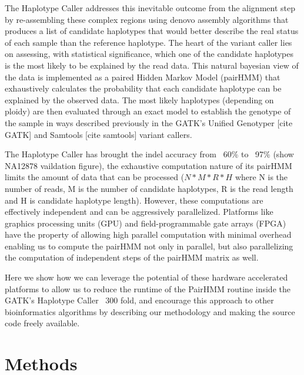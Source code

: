 \documentclass[11pt, oneside]{article}
\begin{document}
    The Haplotype Caller addresses this inevitable outcome from the alignment
    step by re-assembling these complex regions using denovo assembly algorithms
    that produces a list of candidate haplotypes that would better describe the
    real status of each sample than the reference haplotype. The heart of the
    variant caller lies on assessing, with statistical significance, which one
    of the candidate haplotypes is the most likely to be explained by the read
    data. This natural bayesian view of the data is implemented as a paired
    Hidden Markov Model (pairHMM) that exhaustively calculates the probability
    that each candidate haplotype can be explained by the observed data. The
    most likely haplotypes (depending on ploidy) are then evaluated through an
    exact model to establish the genotype of the sample in ways described
    previously in the GATK's Unified Genotyper [cite GATK] and Samtools [cite
    samtools] variant callers. 

    The Haplotype Caller has brought the indel accuracy from ~60\% to ~97\%
    (show NA12878 vaildation figure), the exhaustive computation nature of its
    pairHMM limits the amount of data that can be processed ($N*M*R*H$ where N
    is the number of reads, M is the number of candidate haplotypes, R is the
    read length and H is candidate haplotype length). However, these
    computations are effectively independent and can be aggressively
    parallelized. Platforms like graphics processing units (GPU) and
    field-programmable gate arrays (FPGA) have the property of allowing high
    parallel computation with minimal overhead enabling us to compute the
    pairHMM not only in parallel, but also parallelizing the computation of
    independent steps of the pairHMM matrix as well.

    Here we show how we can leverage the potential of these hardware accelerated
    platforms to allow us to reduce the runtime of the PairHMM routine inside
    the GATK's Haplotype Caller ~300 fold, and encourage this approach to other
    bioinformatics algorithms by describing our methodology and making the
    source code freely available.

	\section{Methods} 
	
\end{document}
